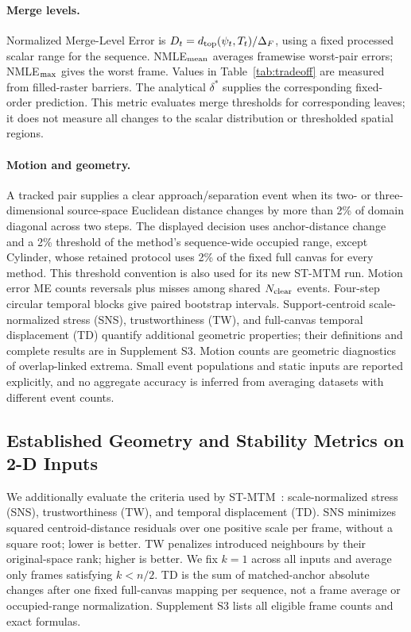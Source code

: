 \paragraph{Merge levels.}
Normalized Merge-Level Error is $D_t=d_{\rm top}(\psi_t,T_t)/\Delta_F$, using a fixed processed scalar range for the sequence. NMLE$_{\rm mean}$ averages framewise worst-pair errors; NMLE$_{\rm max}$ gives the worst frame. Values in Table~\ref{tab:tradeoff} are measured from filled-raster barriers. The analytical $\delta^*$ supplies the corresponding fixed-order prediction. This metric evaluates merge thresholds for corresponding leaves; it does not measure all changes to the scalar distribution or thresholded spatial regions.

\paragraph{Motion and geometry.}
A tracked pair supplies a clear approach/separation event when its two- or three-dimensional source-space Euclidean distance changes by more than 2\% of domain diagonal across two steps. The displayed decision uses anchor-distance change and a 2\% threshold of the method's sequence-wide occupied range, except Cylinder, whose retained protocol uses 2\% of the fixed full canvas for every method. This threshold convention is also used for its new ST-MTM run. Motion error ME counts reversals plus misses among shared $N_{\rm clear}$ events. Four-step circular temporal blocks give paired bootstrap intervals. Support-centroid scale-normalized stress (SNS), trustworthiness (TW), and full-canvas temporal displacement (TD) quantify additional geometric properties; their definitions and complete results are in Supplement S3. Motion counts are geometric diagnostics of overlap-linked extrema. Small event populations and static inputs are reported explicitly, and no aggregate accuracy is inferred from averaging datasets with different event counts.



\subsection{Established Geometry and Stability Metrics on 2-D Inputs}
We additionally evaluate the criteria used by ST-MTM~\cite{STMTM:2026}: scale-normalized stress (SNS), trustworthiness (TW), and temporal displacement (TD). SNS minimizes squared centroid-distance residuals over one positive scale per frame, without a square root; lower is better. TW penalizes introduced neighbours by their original-space rank; higher is better. We fix $k=1$ across all inputs and average only frames satisfying $k<n/2$. TD is the sum of matched-anchor absolute changes after one fixed full-canvas mapping per sequence, not a frame average or occupied-range normalization. Supplement S3 lists all eligible frame counts and exact formulas.

